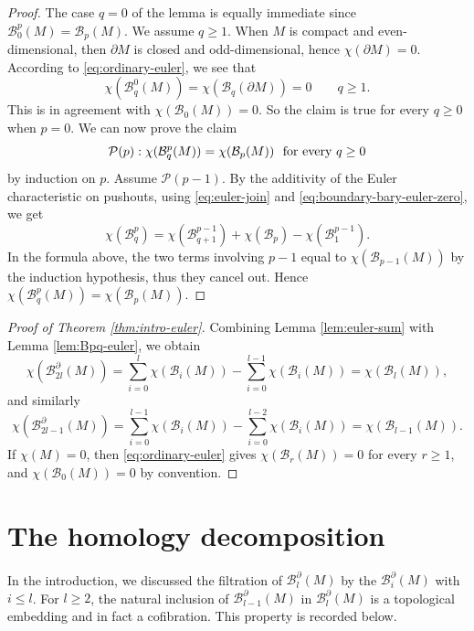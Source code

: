 \documentclass[11pt,a4paper]{article}
\numberwithin{equation}{section}
\theoremstyle{definition}
\theoremstyle{remark}
\newcommand{\pa}{\partial}
\newcommand{\ch}{\chi}
\newcommand{\BB}{\mathcal B}
\begin{document}
\begin{proof}
The case \(q=0\) of the lemma is equally immediate since
\(\BB_0^p(M)= \BB_p(M)\). We assume $q\geq 1$.
When \(M\) is compact and even-dimensional, then \(\pa M\) is closed and odd-dimensional, hence \(\ch(\pa M)=0\). According to \eqref{eq:ordinary-euler}, we see that
\begin{equation}\label{eq:boundary-bary-euler-zero}
\chi (\BB_q^0(M)) = \ch(\BB_q(\pa M))=0
\qquad q\ge1.
\end{equation}
This is in agreement with $\chi (\BB_0(M))=0$. 
So the claim is true for every $q\geq 0$ when $p=0$. We can now prove the claim
$$\mathcal P(p) : \chi(\BB_q^p(M))=\chi(\BB_p(M)) \ \ \hbox{for every $q\geq 0$}$$
by induction on $p$.
Assume $\mathcal P(p-1)$.
 By the additivity of the Euler characteristic on pushouts, using \eqref{eq:euler-join} and \eqref{eq:boundary-bary-euler-zero}, we get
\[
\ch(\BB_q^p)=
\ch(\BB_{q+1}^{p-1})+
\ch(\BB_p)-
\ch(\BB_1^{p-1}).
\]
In the formula above, the two terms involving \(p-1\) equal to
\(\chi(\BB_{p-1}(M))\) by the induction hypothesis, thus they cancel out. Hence
$\chi(\BB_q^p(M)) = \chi (\BB_p(M))$.
\end{proof}




\begin{proof}[Proof of Theorem \ref{thm:intro-euler}]
Combining Lemma \ref{lem:euler-sum} with Lemma \ref{lem:Bpq-euler}, we obtain
\[
\ch(\BB_{2l}^{\pa}(M))=
\sum_{i=0}^{l}\ch(\BB_i(M))-
\sum_{i=0}^{l-1}\ch(\BB_i(M))=\ch(\BB_l(M)),
\]
and similarly
\[
\ch(\BB_{2l-1}^{\pa}(M))=
\sum_{i=0}^{l-1}\ch(\BB_i(M))-
\sum_{i=0}^{l-2}\ch(\BB_i(M))=\ch(\BB_{l-1}(M)).
\]
If \(\ch(M)=0\), then \eqref{eq:ordinary-euler} gives \(\ch(\BB_r(M))=0\) for every \(r\ge1\), and \(\ch(\BB_0(M))=0\) by convention.
\end{proof}




\section{The homology decomposition}
\label{sec:general-homology}

In the introduction, we discussed the filtration of $\BB_l^\pa (M)$ by the $\BB_i^\pa (M)$ with $i\leq l$. 
For \(l\ge2\), the natural inclusion of $\BB_{l-1}^\pa (M)$ in $\BB_l^\pa (M)$ is a topological embedding and in fact a cofibration. This property is recorded below.
\end{document}
